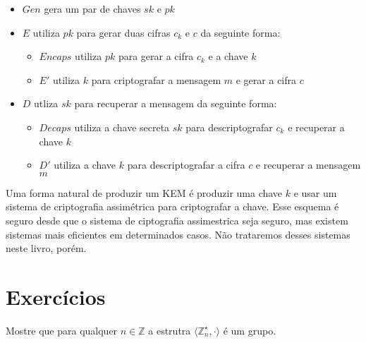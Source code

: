 \begin{itemize}
\item $Gen$ gera um par de chaves $sk$ e $pk$
\item $E$ utiliza $pk$ para gerar duas cifras $c_k$ e $c$ da seguinte forma:
  \begin{itemize}
  \item $Encaps$ utiliza $pk$ para gerar a cifra $c_k$ e a chave $k$
  \item $E'$ utiliza $k$ para criptografar a mensagem $m$ e gerar a cifra $c$
  \end{itemize}
\item $D$ utliza $sk$ para recuperar a mensagem da seguinte forma:
  \begin{itemize}
  \item $Decaps$ utiliza a chave secreta $sk$ para descriptografar $c_k$ e recuperar a chave $k$
  \item $D'$ utiliza a chave $k$ para descriptografar a cifra $c$ e recuperar a mensagem $m$
  \end{itemize}
\end{itemize}

Uma forma natural de produzir um KEM é produzir uma chave $k$ e usar um sistema de criptografia assimétrica para criptografar a chave.
Esse esquema é seguro desde que o sistema de ciptografia assimestrica seja seguro, mas existem sistemas mais eficientes em determinados casos.
Não trataremos desses sistemas neste livro, porém.


\section{Exercícios}
\label{sec:exercicios}


\begin{exercicio}
  \label{ex:euler}
  Mostre que para qualquer $n \in \mathbb{Z}$ a estrutra $\langle \mathbb{Z}_n^\star, \cdot \rangle$ é um grupo.
\end{exercicio}


